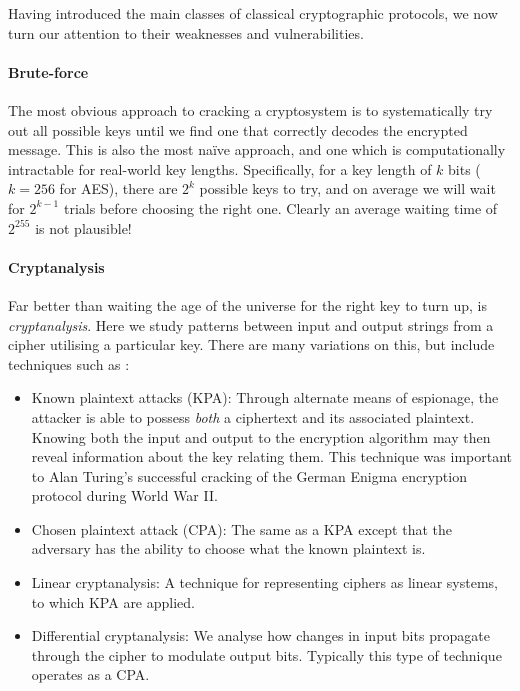 Having introduced the main classes of classical cryptographic protocols, we now turn our attention to their weaknesses and vulnerabilities.

%
%

\paragraph{Brute-force}\label{sec:brute_force_attack}

The most obvious approach to cracking a cryptosystem is to systematically try out all possible keys until we find one that correctly decodes the encrypted message. This is also the most na\"ive approach, and one which is computationally intractable for real-world key lengths. Specifically, for a key length of $k$ bits (\mbox{$k=256$} for AES), there are $2^k$ possible keys to try, and on average we will wait for $2^{k-1}$ trials before choosing the right one. Clearly an average waiting time of $2^{255}$ is not plausible!

%
%

\paragraph{Cryptanalysis}

Far better than waiting the age of the universe for the right key to turn up, is \textit{cryptanalysis}. Here we study patterns between input and output strings from a cipher utilising a particular key. There are many variations on this, but include techniques such as \cite{bib:Schneier96}:

\begin{itemize}
	\item Known plaintext attacks (KPA): Through alternate means of espionage, the attacker is able to possess \textit{both} a ciphertext and its associated plaintext. Knowing both the input and output to the encryption algorithm may then reveal information about the key relating them. This technique was important to Alan Turing's successful cracking of the German Enigma encryption protocol during World War II.
	\item Chosen plaintext attack (CPA): The same as a KPA except that the adversary has the ability to choose what the known plaintext is.
	\item Linear cryptanalysis: A technique for representing ciphers as linear systems, to which KPA are applied.
	\item Differential cryptanalysis: We analyse how changes in input bits propagate through the cipher to modulate output bits. Typically this type of technique operates as a CPA.
\end{itemize}
 
